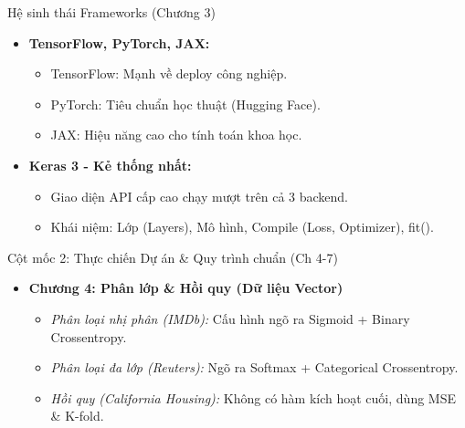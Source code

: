 \documentclass[aspectratio=169]{beamer}
\begin{document}
\begin{frame}{Hệ sinh thái Frameworks (Chương 3)}
    \begin{itemize}
        \item \textbf{TensorFlow, PyTorch, JAX:}
        \begin{itemize}
            \item TensorFlow: Mạnh về deploy công nghiệp.
            \item PyTorch: Tiêu chuẩn học thuật (Hugging Face).
            \item JAX: Hiệu năng cao cho tính toán khoa học.
        \end{itemize}
        \item \textbf{Keras 3 - Kẻ thống nhất:}
        \begin{itemize}
            \item Giao diện API cấp cao chạy mượt trên cả 3 backend.
            \item Khái niệm: Lớp (Layers), Mô hình, Compile (Loss, Optimizer), fit().
        \end{itemize}
    \end{itemize}
\end{frame}

\begin{frame}{Cột mốc 2: Thực chiến Dự án \& Quy trình chuẩn (Ch 4-7)}
    \begin{itemize}
        \item \textbf{Chương 4: Phân lớp \& Hồi quy (Dữ liệu Vector)}
        \begin{itemize}
            \item \textit{Phân loại nhị phân (IMDb):} Cấu hình ngõ ra Sigmoid + Binary Crossentropy.
            \item \textit{Phân loại đa lớp (Reuters):} Ngõ ra Softmax + Categorical Crossentropy.
            \item \textit{Hồi quy (California Housing):} Không có hàm kích hoạt cuối, dùng MSE \& K-fold.
        \end{itemize}
    \end{itemize}
\end{frame}
\end{document}
